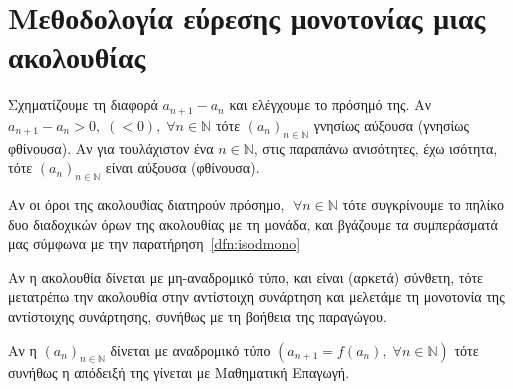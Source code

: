 \documentclass[a4paper,table]{report}
\begin{document}
\section{Μεθοδολογία εύρεσης μονοτονίας μιας ακολουθίας}
\begin{myitemize}
  \item Σχηματίζουμε τη διαφορά $ a_{n+1} - a_n $ και ελέγχουμε το πρόσημό της. 
    Αν $ a_{n+1}-a_{n}>0, \; (<0), \; \forall n \in \mathbb{N} $ τότε 
    $ (a_{n})_{n \in \mathbb{N}}$ γνησίως αύξουσα (γνησίως φθίνουσα). 
    Αν για τουλάχιστον ένα $ n \in \mathbb{N} $, στις παραπάνω ανισότητες, 
    έχω ισότητα, τότε  $ (a_{n})_{n \in \mathbb{N}} $ είναι αύξουσα (φθίνουσα).
  \item Αν οι όροι της ακολουϑίας διατηρούν πρόσημο, $ \; \forall n \in \mathbb{N} $ 
    τότε συγκρίνουμε το πηλίκο δυο διαδοχικών όρων της ακολουθίας με τη μονάδα, 
    και βγάζουμε τα συμπεράσματά μας σύμφωνα με την παρατήρηση~\ref{dfn:isodmono}
  \item Αν η ακολουθία δίνεται με μη-αναδρομικό τύπο, και είναι (αρκετά) σύνθετη, 
    τότε μετατρέπω την ακολουθία στην αντίστοιχη συνάρτηση και μελετάμε τη 
    μονοτονία της αντίστοιχης συνάρτησης, συνήθως με τη βοήθεια της παραγώγου.
  \item Αν η $ (a_{n})_{n \in \mathbb{N}} $ δίνεται με αναδρομικό τύπο 
    $ (a_{n+1}= f(a_{n}), \; \forall n \in \mathbb{N}) $ τότε συνήθως η απόδειξή 
    της γίνεται με Μαθηματική Επαγωγή.
\end{myitemize}
\end{document}
